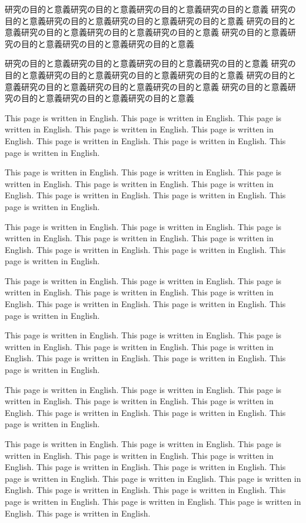 \documentclass[12pt]{jarticle} %
\begin{document}
研究の目的と意義研究の目的と意義研究の目的と意義研究の目的と意義 
研究の目的と意義研究の目的と意義研究の目的と意義研究の目的と意義 
研究の目的と意義研究の目的と意義研究の目的と意義研究の目的と意義 
研究の目的と意義研究の目的と意義研究の目的と意義研究の目的と意義 

研究の目的と意義研究の目的と意義研究の目的と意義研究の目的と意義 
研究の目的と意義研究の目的と意義研究の目的と意義研究の目的と意義 
研究の目的と意義研究の目的と意義研究の目的と意義研究の目的と意義 
研究の目的と意義研究の目的と意義研究の目的と意義研究の目的と意義 


\newpage

This page is written in English. This page is written in English. 
This page is written in English. This page is written in English. 
This page is written in English. This page is written in English. 
This page is written in English. This page is written in English. 

This page is written in English. This page is written in English. 
This page is written in English. This page is written in English. 
This page is written in English. This page is written in English. 
This page is written in English. This page is written in English. 

This page is written in English. This page is written in English. 
This page is written in English. This page is written in English. 
This page is written in English. This page is written in English. 
This page is written in English. This page is written in English. 

This page is written in English. This page is written in English. 
This page is written in English. This page is written in English. 
This page is written in English. This page is written in English. 
This page is written in English. This page is written in English. 

This page is written in English. This page is written in English. 
This page is written in English. This page is written in English. 
This page is written in English. This page is written in English. 
This page is written in English. This page is written in English. 

This page is written in English. This page is written in English. 
This page is written in English. This page is written in English. 
This page is written in English. This page is written in English. 
This page is written in English. This page is written in English. 

This page is written in English. This page is written in English. 
This page is written in English. This page is written in English. 
This page is written in English. This page is written in English. 
This page is written in English. This page is written in English. 
This page is written in English. This page is written in English. 
This page is written in English. This page is written in English. 
This page is written in English. This page is written in English. 
This page is written in English. This page is written in English. 
\end{document}
